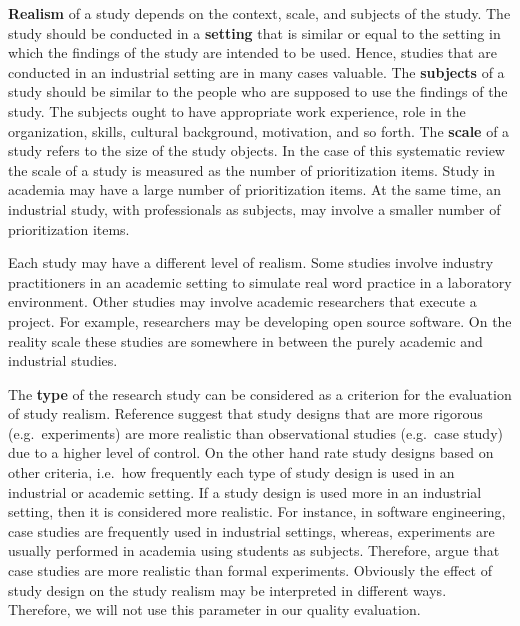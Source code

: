 \textbf{Realism} of a study depends on the context, scale, and subjects of the study.
The study should be conducted in a \textbf{setting} that is similar or equal to the setting in which the findings of the study are intended to be used. Hence, studies that are conducted in an industrial setting are in many cases valuable.
The \textbf{subjects} of a study should be similar to the people who are supposed to use the findings of the study. The subjects ought to have appropriate work experience, role in the organization, skills, cultural background, motivation, and so forth.
The \textbf{scale} of a study refers to the size of the study objects. 
In the case of this systematic review the scale of a study is measured as the number of prioritization items.
Study in academia may have a large number of prioritization items. At the same time, an industrial study, with professionals as subjects, may involve a smaller number of prioritization items.

Each study may have a different level of realism. Some studies involve industry practitioners in an academic setting to simulate real word practice in a laboratory environment.
Other studies may involve academic researchers that execute a project. For example, researchers may be developing open source software.
On the reality scale these studies are somewhere in between the purely academic and industrial studies.

The \textbf{type} of the research study can be considered as a criterion for the evaluation of study realism. Reference \cite{Kitchenham2004} suggest that study designs that are more rigorous (e.g.\ experiments) are more realistic than observational studies (e.g.\ case study) due to a higher level of control. On the other hand \citep{Ivarsson2010} rate study designs based on other criteria, i.e.\ how frequently each type of study design is used in an industrial or academic setting. If a study design is used more in an industrial setting, then it is considered more realistic. For instance, in software engineering, case studies are frequently used in industrial settings, whereas, experiments are usually performed in academia using students as subjects. Therefore, \citep{Ivarsson2010} argue that case studies are more realistic than  formal experiments. Obviously the effect of study design on the study realism may be interpreted in different ways. Therefore, we will not use this parameter in our quality evaluation.

